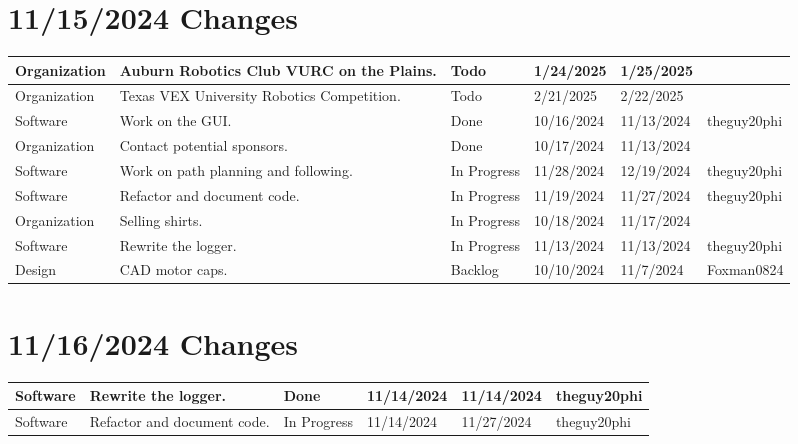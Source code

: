 \section{11/15/2024 Changes}
\begin{center}
\begin{longtable}{| p{40pt} | p{150pt} | p{35pt} | p{33pt} | p{33pt} | p{40pt} |}
\hline \rowcolor{IndianRed1}
Organization & Auburn Robotics Club VURC on the Plains. & Todo & 1/24/2025 & 1/25/2025 & \\
\hline \rowcolor{IndianRed1}
Organization & Texas VEX University Robotics Competition. & Todo & 2/21/2025 & 2/22/2025 & \\
\hline \rowcolor{DarkSeaGreen1}
Software & Work on the GUI. & Done & 10/16/2024 & 11/13/2024 & theguy20phi \\
\hline \rowcolor{DarkSeaGreen1}
Organization & Contact potential sponsors. & Done & 10/17/2024 & 11/13/2024 & \\
\hline \rowcolor{LightGoldenrod1}
Software & Work on path planning and following. & In Progress & 11/28/2024 & 12/19/2024 & theguy20phi \\
\hline \rowcolor{LightGoldenrod1}
Software & Refactor and document code. & In Progress & 11/19/2024 & 11/27/2024 & theguy20phi \\
\hline \rowcolor{LightGoldenrod1}
Organization & Selling shirts. & In Progress & 10/18/2024 & 11/17/2024 & \\
\hline \rowcolor{LightGoldenrod1}
Software & Rewrite the logger. & In Progress & 11/13/2024 & 11/13/2024 & theguy20phi \\
\hline \rowcolor{Ivory2}
Design & CAD motor caps. & Backlog & 10/10/2024 & 11/7/2024 & Foxman0824 \\
\hline
\end{longtable}
\end{center}


\section{11/16/2024 Changes}
\begin{center}
\begin{longtable}{| p{40pt} | p{150pt} | p{35pt} | p{33pt} | p{33pt} | p{40pt} |}
\hline \rowcolor{DarkSeaGreen1}
Software & Rewrite the logger. & Done & 11/14/2024 & 11/14/2024 & theguy20phi \\
\hline \rowcolor{LightGoldenrod1}
Software & Refactor and document code. & In Progress & 11/14/2024 & 11/27/2024 & theguy20phi \\
\hline
\end{longtable}
\end{center}


